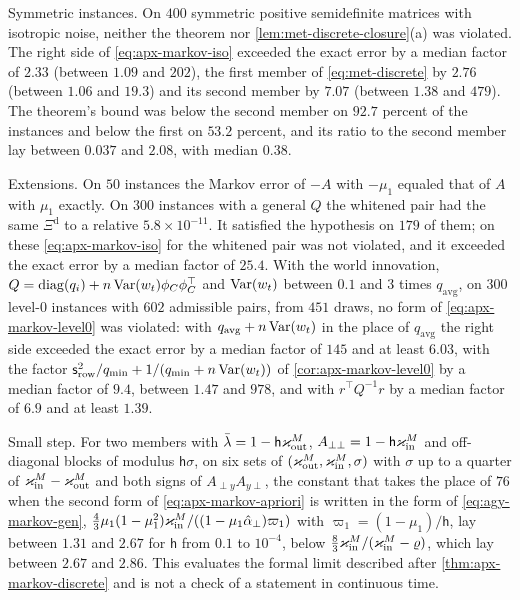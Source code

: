 \begin{numcheck}
Symmetric instances. On $400$ symmetric positive semidefinite matrices with isotropic noise, neither the theorem nor \cref{lem:met-discrete-closure}(a) was violated. The right side of \eqref{eq:apx-markov-iso} exceeded the exact error by a median factor of $2.33$ (between $1.09$ and $202$), the first member of \eqref{eq:met-discrete} by $2.76$ (between $1.06$ and $19.3$) and its second member by $7.07$ (between $1.38$ and $479$). The theorem's bound was below the second member on $92.7$ percent of the instances and below the first on $53.2$ percent, and its ratio to the second member lay between $0.037$ and $2.08$, with median $0.38$.

Extensions. On $50$ instances the Markov error of $-A$ with $-\mu_1$ equaled that of $A$ with $\mu_1$ exactly. On $300$ instances with a general $Q$ the whitened pair had the same $\Xi^{\mathrm d}$ to a relative $5.8\times10^{-11}$. It satisfied the hypothesis on $179$ of them; on these \eqref{eq:apx-markov-iso} for the whitened pair was not violated, and it exceeded the exact error by a median factor of $25.4$. With the world innovation, $Q=\operatorname{diag}(q_i)+n\operatorname{Var}(w_t)\phi_C\phi_C^\top$ and $\operatorname{Var}(w_t)$ between $0.1$ and $3$ times $q_{\mathrm{avg}}$, on $300$ level-0 instances with $602$ admissible pairs, from $451$ draws, no form of \eqref{eq:apx-markov-level0} was violated: with $q_{\mathrm{avg}}+n\operatorname{Var}(w_t)$ in the place of $q_{\mathrm{avg}}$ the right side exceeded the exact error by a median factor of $145$ and at least $6.03$, with the factor $\mathsf s_{\mathrm{row}}^2/q_{\min}+1/(q_{\min}+n\operatorname{Var}(w_t))$ of \cref{cor:apx-markov-level0} by a median factor of $9.4$, between $1.47$ and $978$, and with $r^\top Q^{-1}r$ by a median factor of $6.9$ and at least $1.39$.

Small step. For two members with $\bar\lambda=1-\mathsf h\varkappa_{\mathrm{out}}^M$, $A_{\perp\perp}=1-\mathsf h\varkappa_{\mathrm{in}}^M$ and off-diagonal blocks of modulus $\mathsf h\sigma$, on six sets of $(\varkappa_{\mathrm{out}}^M,\varkappa_{\mathrm{in}}^M,\sigma)$ with $\sigma$ up to a quarter of $\varkappa_{\mathrm{in}}^M-\varkappa_{\mathrm{out}}^M$ and both signs of $A_{\perp y}A_{y\perp}$, the constant that takes the place of $76$ when the second form of \eqref{eq:apx-markov-apriori} is written in the form of \eqref{eq:agy-markov-gen}, $\frac43\mu_1(1-\mu_1^2)\varkappa_{\mathrm{in}}^M/((1-\mu_1\hat\alpha_\perp)\varpi_1)$ with $\varpi_1=(1-\mu_1)/\mathsf h$, lay between $1.31$ and $2.67$ for $\mathsf h$ from $0.1$ to $10^{-4}$, below $\frac83\varkappa_{\mathrm{in}}^M/(\varkappa_{\mathrm{in}}^M-\varrho)$, which lay between $2.67$ and $2.86$. This evaluates the formal limit described after \cref{thm:apx-markov-discrete} and is not a check of a statement in continuous time.
\end{numcheck}


